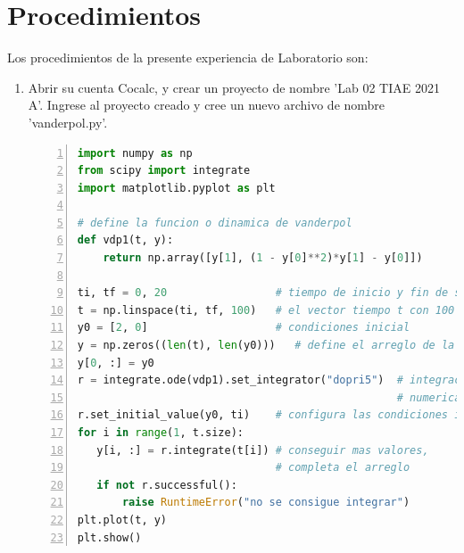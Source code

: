 \documentclass[12pt,oneside,spanish]{article}
\begin{document}
\section{Procedimientos}
Los procedimientos de la presente experiencia de Laboratorio son:
\begin{enumerate}
\item Abrir su cuenta Cocalc, y crear un proyecto de nombre 'Lab 02 TIAE 2021 A'. Ingrese al proyecto creado y cree un nuevo archivo de nombre 'vanderpol.py'.
\begin{lstlisting}[language=Python,numbers=left,numbersep=5pt,numberstyle=\tiny, frame=single, basicstyle=\footnotesize]
import numpy as np
from scipy import integrate
import matplotlib.pyplot as plt

# define la funcion o dinamica de vanderpol
def vdp1(t, y):
    return np.array([y[1], (1 - y[0]**2)*y[1] - y[0]])
    
ti, tf = 0, 20                 # tiempo de inicio y fin de solucion
t = np.linspace(ti, tf, 100)   # el vector tiempo t con 100 pasos
y0 = [2, 0]                    # condiciones inicial
y = np.zeros((len(t), len(y0)))   # define el arreglo de la solucion
y[0, :] = y0
r = integrate.ode(vdp1).set_integrator("dopri5")  # integracion
                                                  # numerica
r.set_initial_value(y0, ti)    # configura las condiciones iniciales
for i in range(1, t.size):
   y[i, :] = r.integrate(t[i]) # conseguir mas valores,
                               # completa el arreglo
   if not r.successful():
       raise RuntimeError("no se consigue integrar")
plt.plot(t, y)
plt.show()
\end{lstlisting}


\end{enumerate}
\end{document}
